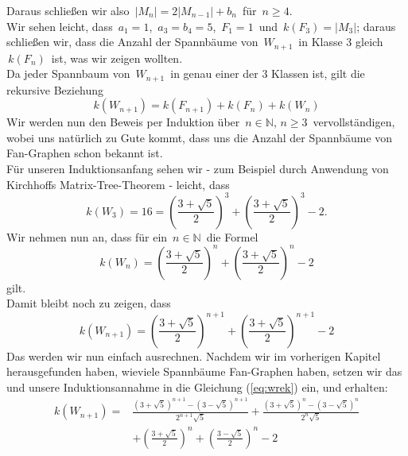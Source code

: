 Daraus schließen wir also $\,|M_{n}|=2|M_{n-1}|+b_{n}\,$ für $\,n\geq4$.\; \\
Wir sehen leicht, dass $\,a_1=1$,\; $\,a_3=b_4=5$,\; $\,F_1=1\,$ und $\,\mathit{k}\left(F_3\right)=|M_3|$; daraus schließen wir, dass die Anzahl der Spannbäume von $\,W_{n+1}\,$ in Klasse 3 gleich $\,\mathit{k}\left(F_{n}\right)\,$ ist, was wir zeigen wollten.\\
Da jeder Spannbaum von $\,W_{n+1}\,$ in genau einer der 3 Klassen ist, gilt die rekursive Beziehung
\begin{equation}
\mathit{k}\left(W_{n+1}\right) = \mathit{k}\left(F_{n+1}\right) + \mathit{k}\left(F_n\right) + \mathit{k}\left(W_n\right)
\label{eq:wrek}
\end{equation}
Wir werden nun den Beweis per Induktion über $\,n \in \mathbb{N}, \, n \geq 3\,$ vervollständigen, wobei uns natürlich zu Gute kommt, dass uns die Anzahl der Spannbäume von Fan-Graphen schon bekannt ist.\\
Für unseren Induktionsanfang sehen wir - zum Beispiel durch Anwendung von Kirchhoffs Matrix-Tree-Theorem - leicht, dass \begin{equation}
\mathit{k}\left(W_3\right) = 16 = \left(\frac{3+\sqrt{5}}{2}\right)^3+\left(\frac{3+\sqrt{5}}{2}\right)^3-2.
\end{equation}
Wir nehmen nun an, dass für ein $\,n \in \mathbb{N}\,$ die Formel 
\begin{equation}
 \mathit{k}\left(W_n\right) = \left(\frac{3+\sqrt{5}}{2}\right)^n+\left(\frac{3+\sqrt{5}}{2}\right)^n-2
\end{equation}
gilt.\\
Damit bleibt noch zu zeigen, dass
\begin{equation}
 \mathit{k}\left(W_{n+1}\right) = \left(\frac{3+\sqrt{5}}{2}\right)^{n+1}+\left(\frac{3+\sqrt{5}}{2}\right)^{n+1}-2
\end{equation}
Das werden wir nun einfach ausrechnen.
Nachdem wir im vorherigen Kapitel herausgefunden haben, wieviele Spannbäume Fan-Graphen haben, setzen wir das und unsere Induktionsannahme in die Glei\-chung (\ref{eq:wrek}) ein, und erhalten:\\
\begin{equation}
\begin{aligned}
\mathit{k}\left(W_{n+1}\right) ={} & \frac{\left(3+\sqrt{5}\right)^{n+1}-\left(3-\sqrt{5}\right)^{n+1}}{2^{n+1}\sqrt{5}} + \frac{\left(3+\sqrt{5}\right)^{n}-\left(3-\sqrt{5}\right)^{n}}{2^{n}\sqrt{5}}\\
& + \left(\frac{3+\sqrt{5}}{2}\right)^n+\left(\frac{3-\sqrt{5}}{2}\right)^n-2
\end{aligned}
\end{equation}
